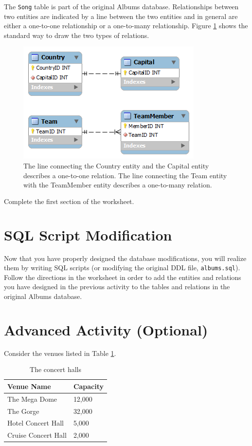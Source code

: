 \documentclass[12pt]{scrartcl}
\begin{document}
The \texttt{Song} table is part of the original Albums 
database. Relationships between two entities are indicated by a 
line between the two entities and in general are either a 
one-to-one relationship or a one-to-many relationship.  Figure \ref{figure:example} shows the standard way to draw the two types 
of relations.
 
\begin{figure}[h]
\centering
\includegraphics[scale=.50]{images/Example}
\caption{The line connecting the Country entity and the Capital entity describes a one-to-one relation. The line connecting the Team entity with the TeamMember entity describes a one-to-many relation.}
\label{figure:example}
\end{figure}

Complete the first section of the worksheet. 

\section*{SQL Script Modification}

Now that you have properly designed the database modifications, 
you will realize them by writing SQL scripts (or modifying the 
original DDL file, \texttt{albums.sql}).  Follow the directions in the 
worksheet in order to add the entities and relations you have 
designed in the previous activity to the tables and relations 
in the original Albums database.

\section*{Advanced Activity (Optional)}

Consider the venues listed in Table \ref{table:concertHalls}.

\begin{table}[h]
\centering
\begin{tabular}{l|l}
Venue Name & Capacity \\
\hline\hline
The Mega Dome & 12,000 \\
The Gorge & 32,000 \\
Hotel Concert Hall & 5,000 \\
Cruise Concert Hall & 2,000 \\
\end{tabular}
\caption{The concert halls}
\label{table:concertHalls}
\end{table}
\end{document}
